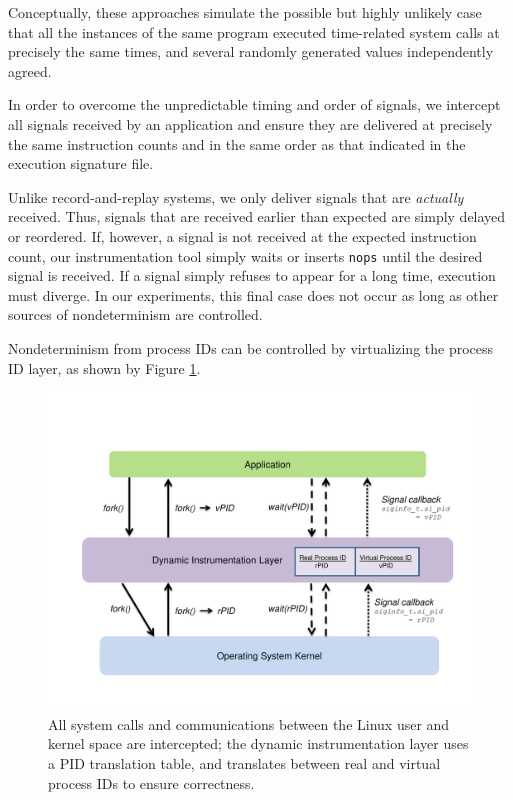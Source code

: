 Conceptually, these approaches simulate the possible but highly
unlikely case that all the instances of the same program
executed time-related system calls
at precisely the same times,
and several randomly generated values independently agreed. \newline

 \newline
In order to overcome the unpredictable timing and 
order of signals, we intercept all signals received by 
an application and ensure they are delivered
at precisely the same instruction counts
and in the same order as that indicated
in the execution signature file.

Unlike record-and-replay systems, we only
deliver signals that are {\em actually}
received. Thus, signals that are received earlier
than expected are simply delayed or reordered. If,
however, a signal is not received at the expected
instruction count, our instrumentation tool
simply waits or inserts \texttt{nops} until the 
desired signal is received. If a signal simply
refuses to appear for a long time, execution
must diverge. In our experiments,
this final case does not occur as long
as other sources of nondeterminism are controlled. \newline

 \newline
Nondeterminism from process IDs
can be controlled by virtualizing the process ID
layer, as shown by Figure \ref{ch3:pidfig}.

\begin{figure}[h]
  \center
  \includegraphics[trim=0cm 1cm 0cm 0.5cm, scale=0.60]{pid.pdf}
  \caption[Virtualizing the process ID layer using Pin]%
  {All system calls and communications
  between the Linux user and kernel space are intercepted; 
  the dynamic instrumentation layer
  uses a PID translation table, and
  translates between real and virtual process IDs
  to ensure correctness. }
  
  \label{ch3:pidfig}
\end{figure} 

